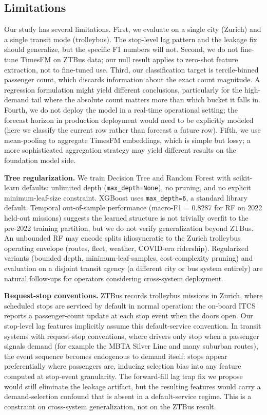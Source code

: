 \subsection{Limitations}

Our study has several limitations. First, we evaluate on a single city
(Zurich) and a single transit mode (trolleybus). The stop-level lag pattern
and the leakage fix should generalize, but the specific F1 numbers will
not. Second, we do not fine-tune TimesFM on ZTBus data; our null result
applies to zero-shot feature extraction, not to fine-tuned use. Third, our
classification target is tercile-binned passenger count, which discards
information about the exact count magnitude. A regression formulation
might yield different conclusions, particularly for the high-demand tail
where the absolute count matters more than which bucket it falls in.
Fourth, we do not deploy the model in a real-time operational setting;
the forecast horizon in production deployment would need to be explicitly
modeled (here we classify the current row rather than forecast a future
row). Fifth, we use mean-pooling to aggregate TimesFM embeddings, which is
simple but lossy; a more sophisticated aggregation strategy may yield
different results on the foundation model side.

\textbf{Tree regularization.} We train Decision Tree and Random Forest
with scikit-learn defaults: unlimited depth (\texttt{max\_depth=None}),
no pruning, and no explicit minimum-leaf-size constraint. XGBoost uses
\texttt{max\_depth=6}, a standard library default. Temporal
out-of-sample performance (macro-F1 = 0.8287 for RF on 2022 held-out
missions) suggests the learned structure is not trivially overfit to
the pre-2022 training partition, but we do not verify generalization
beyond ZTBus. An unbounded RF may encode splits idiosyncratic to the
Zurich trolleybus operating envelope (routes, fleet, weather, COVID-era
ridership). Regularized variants (bounded depth, minimum-leaf-samples,
cost-complexity pruning) and evaluation on a disjoint transit agency
(a different city or bus system entirely) are natural follow-ups for
operators considering cross-system deployment.

\textbf{Request-stop conventions.} ZTBus records trolleybus missions in
Zurich, where scheduled stops are serviced by default in normal
operation: the on-board ITCS reports a passenger-count update at each
stop event when the doors open. Our stop-level lag features implicitly
assume this default-service convention. In transit systems with
request-stop conventions, where drivers only stop when a passenger
signals demand (for example the MBTA Silver Line and many suburban
routes), the event sequence becomes endogenous to demand itself: stops
appear preferentially where passengers are, inducing selection bias
into any feature computed at stop-event granularity. The forward-fill
lag trap fix we propose would still eliminate the leakage artifact, but
the resulting features would carry a demand-selection confound that is
absent in a default-service regime. This is a constraint on
cross-system generalization, not on the ZTBus result.
